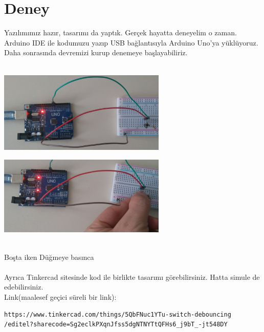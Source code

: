 \documentclass[11pt]{article}
\newcommand\tab[1][1cm]{\hspace*{#1}}
\begin{document}
\section{Deney}
Yazılımımız hazır, tasarımı da yaptık. Gerçek hayatta deneyelim o zaman. Arduino IDE ile kodumuzu yazıp USB bağlantısıyla Arduino Uno'ya yüklüyoruz. Daha sonrasında devremizi kurup denemeye başlayabiliriz.\\~\\
\begin{minipage}{0.5\textwidth}
\includegraphics[width=8cm]{idle.jpg}
\end{minipage}
\begin{minipage}{0.5\textwidth}
\includegraphics[width=8cm]{pressed.jpg}
\end{minipage}\\

\tab Boşta iken \tab[6cm] Düğmeye basınca\\~\\
Ayrıca Tinkercad sitesinde kod ile birlikte tasarımı görebilirsiniz. Hatta simule de edebilirsiniz.\\
Link(maalesef geçici süreli bir link):
\begin{lstlisting}
https://www.tinkercad.com/things/5QbFNuc1YTu-switch-debouncing
/editel?sharecode=Sg2eclkPXqnJfss5dgNTNYTtQFHs6_j9bT_-jt548DY
\end{lstlisting}
\end{document}
